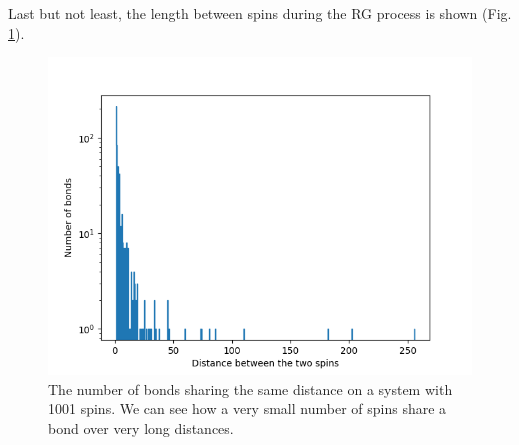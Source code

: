 \documentclass[../numerical,../../main.tex]{subfiles}
\begin{document}
Last but not least, the length between spins during the RG process is shown (Fig. \ref{fig:distance}).
\begin{figure}[h!]
    \centering
    \includegraphics[scale=0.5]{Chapter5/Figures/distance.png}
    \caption{The number of bonds sharing the same distance on a system with 1001 spins. We can see how a very small number of spins share a bond over very long distances.}
    \label{fig:distance}
\end{figure}
\end{document}
